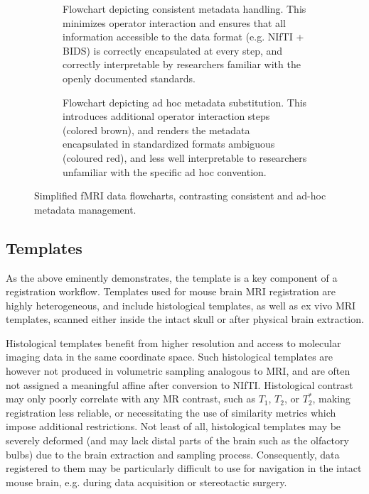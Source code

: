 \begin{figure*}[h!]
	\begin{subfigure}{\textwidth}
		\centering
		\vspace{-2.5em}
		\caption{
			Flowchart depicting consistent metadata handling. This minimizes operator interaction and ensures that all information accessible to the data format (e.g. NIfTI + BIDS) is correctly encapsulated at every step, and correctly interpretable by researchers familiar with the openly documented standards.
			}
		\label{fig:mdg}
	\end{subfigure}
	\begin{subfigure}{\textwidth}
		\centering
		\vspace{-2.5em}
		\caption{
			Flowchart depicting ad hoc metadata substitution. This introduces additional operator interaction steps (colored brown), and renders the metadata encapsulated in standardized formats ambiguous (coloured red), and less well interpretable to researchers unfamiliar with the specific ad hoc convention.
			}
		\label{fig:mdb}
	\end{subfigure}
	\caption{
		Simplified fMRI data flowcharts, contrasting consistent and ad-hoc metadata management.
		}
	\label{fig:md}
\end{figure*}

\subsection{Templates}
As the above eminently demonstrates, the template is a key component of a registration workflow.
Templates used for mouse brain MRI registration are highly heterogeneous, and include histological templates, as well as ex vivo MRI templates, scanned either inside the intact skull or after physical brain extraction.

Histological templates benefit from higher resolution and access to molecular imaging data in the same coordinate space.
Such histological templates are however not produced in volumetric sampling analogous to MRI, and are often not assigned a meaningful affine after conversion to NIfTI.
Histological contrast may only poorly correlate with any MR contrast, such as $T_1$, $T_2$, or $T_2^*$, making registration less reliable, or necessitating the use of similarity metrics which impose additional restrictions.
Not least of all, histological templates may be severely deformed (and may lack distal parts of the brain such as the olfactory bulbs) due to the brain extraction and sampling process.
Consequently, data registered to them may be particularly difficult to use for navigation in the intact mouse brain, e.g. during data acquisition or stereotactic surgery.

